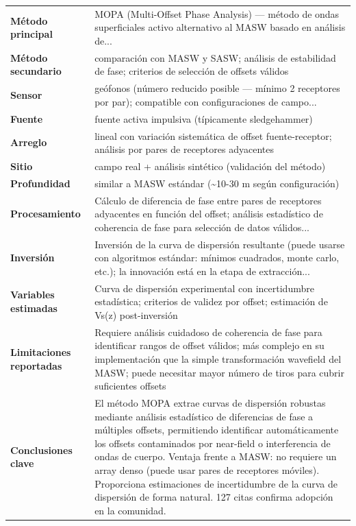 \begin{center}\scriptsize
\begin{tabularx}{\textwidth}{@{}>{\bfseries}p{3.3cm} X@{}}
\toprule
M\'etodo principal & MOPA (Multi-Offset Phase Analysis) --- método de ondas superficiales activo alternativo al MASW basado en análisis de... \\
M\'etodo secundario & comparación con MASW y SASW; análisis de estabilidad de fase; criterios de selección de offsets válidos \\
Sensor & geófonos (número reducido posible --- mínimo 2 receptores por par); compatible con configuraciones de campo... \\
Fuente & fuente activa impulsiva (típicamente sledgehammer) \\
Arreglo & lineal con variación sistemática de offset fuente-receptor; análisis por pares de receptores adyacentes \\
Sitio & campo real + análisis sintético (validación del método) \\
Profundidad & similar a MASW estándar (\textasciitilde{}10-30 m según configuración) \\
Procesamiento & Cálculo de diferencia de fase entre pares de receptores adyacentes en función del offset; análisis estadístico de coherencia de fase para selección de datos válidos... \\
Inversi\'on & Inversión de la curva de dispersión resultante (puede usarse con algoritmos estándar: mínimos cuadrados, monte carlo, etc.); la innovación está en la etapa de extracción... \\
Variables estimadas & Curva de dispersión experimental con incertidumbre estadística; criterios de validez por offset; estimación de Vs(z) post-inversión \\
Limitaciones reportadas & Requiere análisis cuidadoso de coherencia de fase para identificar rangos de offset válidos; más complejo en su implementación que la simple transformación wavefield del MASW; puede necesitar mayor número de tiros para cubrir suficientes offsets \\
Conclusiones clave & El método MOPA extrae curvas de dispersión robustas mediante análisis estadístico de diferencias de fase a múltiples offsets, permitiendo identificar automáticamente los offsets contaminados por near-field o interferencia de ondas de cuerpo. Ventaja frente a MASW: no requiere un array denso (puede usar pares de receptores móviles). Proporciona estimaciones de incertidumbre de la curva de dispersión de forma natural. 127 citas confirma adopción en la comunidad. \\

\end{tabularx}
\end{center}
